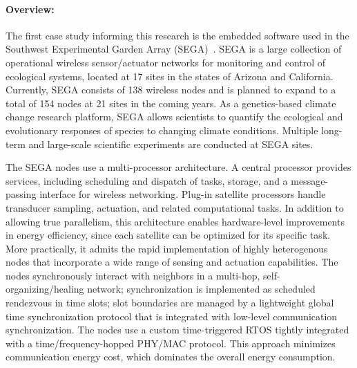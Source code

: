 
\paragraph{Overview:}

The first case study informing this research is the embedded software used in the Southwest Experimental Garden Array (SEGA)~\cite{ClaEtAl11,GhoEtAl2014,BelEtAl2015}.
SEGA is a large collection of operational wireless sensor/actuator networks for monitoring and control of ecological systems, located at 17 sites in the states of Arizona and California.
Currently, SEGA consists of 138 wireless nodes and is planned to expand to a total of 154 nodes at 21 sites in the coming years.
As a genetics-based climate change research platform, SEGA allows scientists to quantify the ecological and evolutionary responses of species to changing climate conditions.
Multiple long-term and large-scale scientific experiments are conducted at SEGA sites.


The SEGA nodes use a multi-processor architecture.
A central processor provides services, including scheduling and dispatch of tasks, storage, and a message-passing interface for wireless networking.
Plug-in satellite processors handle transducer sampling, actuation, and related computational tasks.
In addition to allowing true parallelism, this architecture enables hardware-level improvements in energy efficiency, since each satellite can be optimized for its specific task.
More practically, it admits the rapid implementation of highly heterogenous nodes that incorporate a wide range of sensing and actuation capabilities.
%
The nodes synchronously interact with neighbors in a multi-hop, self-organizing/healing network; synchronization is implemented as scheduled rendezvous in time slots; slot boundaries are managed by a lightweight global time synchronization protocol that is integrated with low-level communication synchronization.
The nodes use a custom time-triggered RTOS tightly integrated with a time/frequency-hopped PHY/MAC protocol.
This approach %
minimizes communication energy cost, which dominates the overall energy consumption.

